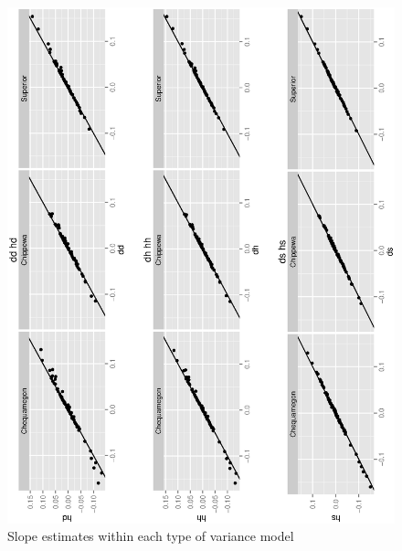 \documentclass{article}
\begin{document}
\begin{figure}[h!]
\centering
\includegraphics[scale=.6, angle=-90]{slp_bet.ps}
\caption{ Slope estimates within each type of variance model}
\end{figure} 




\end{document}
